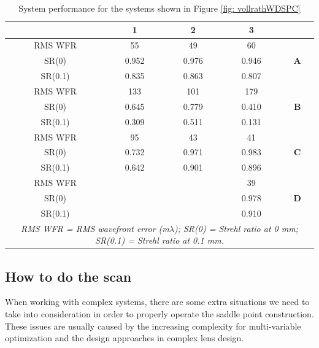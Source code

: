 \setlength{\arrayrulewidth}{.5mm}
\setlength{\tabcolsep}{18pt}
\renewcommand{\arraystretch}{1.2}
\begin{table}[h!]
    \centering
    \captionsetup{justification=centering}
    \caption{System performance for the systems shown in Figure \ref{fig: vollrathWDSPC}}
    \label{table: vollrathWDcase}
    \vspace{-1em}
    \begin{adjustbox}{max width=\textwidth, center}
    \begin{tabular}{c c c c c}
    \hline 
       & \textbf{1} & \textbf{2} & \textbf{3} & \\ 
     \midrule
    RMS WFR & 55 & 49 & 60 & \multirow{3}{*}{\textbf{A}} \\ 
    SR(0) & 0.952 & 0.976 & 0.946  \\
    SR(0.1) & 0.835 & 0.863 & 0.807  \\
    \midrule
    RMS WFR & 133 & 101 & 179 & \multirow{3}{*}{\textbf{B}} \\ 
    SR(0) & 0.645 & 0.779 & 0.410  \\
    SR(0.1) & 0.309 & 0.511 & 0.131  \\
    \midrule
    RMS WFR & 95 & 43 & 41 & \multirow{3}{*}{\textbf{C}} \\ 
    SR(0) & 0.732 & 0.971 & 0.983  \\
    SR(0.1) & 0.642 & 0.901 & 0.896 \\
    \midrule
    RMS WFR &  & & 39 & \multirow{3}{*}{\textbf{D}} \\ 
    SR(0) &  &  & 0.978 \\
    SR(0.1) &  &  & 0.910 \\
    \hline
    \multicolumn{5}{c}{\textit{\footnotesize{RMS WFR = RMS wavefront error (m$\lambda$); SR(0) = Strehl ratio at 0 mm; SR(0.1) = Strehl ratio at 0.1 mm.}}}\\
    \end{tabular}
    \end{adjustbox}
\end{table}


\subsection{How to do the scan}

When working with complex systems, there are some extra situations we need to take into consideration in order to properly operate the saddle point construction. These issues are usually caused by the increasing complexity for multi-variable optimization and  the design approaches in complex lens design. 

